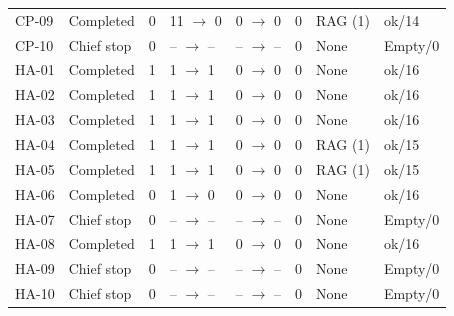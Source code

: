 \begin{tabular}{llllllll}
CP-09 & Completed & 0 & 11 $\to$ 0 & 0 $\to$ 0 & 0 & RAG (1) & ok/14 \\
CP-10 & Chief stop & 0 & -- $\to$ -- & -- $\to$ -- & 0 & None & Empty/0 \\
HA-01 & Completed & 1 & 1 $\to$ 1 & 0 $\to$ 0 & 0 & None & ok/16 \\
HA-02 & Completed & 1 & 1 $\to$ 1 & 0 $\to$ 0 & 0 & None & ok/16 \\
HA-03 & Completed & 1 & 1 $\to$ 1 & 0 $\to$ 0 & 0 & None & ok/16 \\
HA-04 & Completed & 1 & 1 $\to$ 1 & 0 $\to$ 0 & 0 & RAG (1) & ok/15 \\
HA-05 & Completed & 1 & 1 $\to$ 1 & 0 $\to$ 0 & 0 & RAG (1) & ok/15 \\
HA-06 & Completed & 0 & 1 $\to$ 0 & 0 $\to$ 0 & 0 & None & ok/16 \\
HA-07 & Chief stop & 0 & -- $\to$ -- & -- $\to$ -- & 0 & None & Empty/0 \\
HA-08 & Completed & 1 & 1 $\to$ 1 & 0 $\to$ 0 & 0 & None & ok/16 \\
HA-09 & Chief stop & 0 & -- $\to$ -- & -- $\to$ -- & 0 & None & Empty/0 \\
HA-10 & Chief stop & 0 & -- $\to$ -- & -- $\to$ -- & 0 & None & Empty/0 \\
\hline
\end{tabular}
